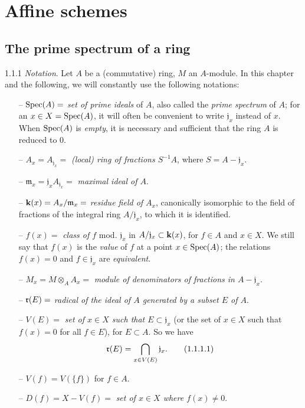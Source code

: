 \documentclass[10pt,oneside]{book}
\begin{document}
\setcounter{section}{0}
\section{Affine schemes}
\label{1-schemes-1}

\setcounter{subsection}{0}
\subsection{The prime spectrum of a ring}
\label{1-schemes-1.1}

\begin{env}{1.1.1}
\label{env-1.1.1.1}
\emph{Notation}. Let $A$ be a (commutative) ring, $M$ an $A$-module. In
this chapter and the following, we will constantly use the following notations:
\begin{itemize}
  \item[--] ${\mathop{\mathrm{Spec}}\nolimits}(A)=$ \emph{set of prime ideals} of $A$, also called the
          \emph{prime spectrum} of $A$; for an $x\in X={\mathop{\mathrm{Spec}}\nolimits}(A)$, it will often be
          convenient to write $\mathfrak{j}_x$ instead of $x$. When ${\mathop{\mathrm{Spec}}\nolimits}(A)$ is
          \emph{empty}, it is necessary and sufficient that the ring $A$ is
          reduced to $0$.
  \item[--] $A_x=A_{\mathfrak{j}_x}=$ \emph{(local) ring of fractions $S^{-1}A$},
          where $S=A-\mathfrak{j}_x$.
  \item[--] $\mathfrak{m}_x=\mathfrak{j}_x A_{\mathfrak{j}_x}=$ \emph{maximal ideal of $A$}.
  \item[--] $\mathbf{k}(x)=A_x/\mathfrak{m}_x=$ \emph{residue field of $A_x$},
          canonically isomorphic to the field of fractions
          of the integral ring $A/\mathfrak{j}_x$, to which it is identified.
  \item[--] $f(x)=$ \emph{class of $f$} mod. $\mathfrak{j}_x$ in $A/\mathfrak{j}_x\subset\mathbf{k}(x)$,
          for $f\in A$ and $x\in X$. We still say that $f(x)$ is the \emph{value}
          of $f$ at a point $x\in{\mathop{\mathrm{Spec}}\nolimits}(A)$; the relations $f(x)=0$ and $f\in\mathfrak{j}_x$
          are \emph{equivalent}.
  \item[--] $M_x=M\otimes_A A_x=$ \emph{module of denominators of fractions in
          $A-\mathfrak{j}_x$}.
  \item[--] $\mathfrak{r}(E)=$ \emph{radical of the ideal of $A$ generated by a subset $E$ of $A$}.
  \item[--] $V(E)=$ \emph{set of $x\in X$ such that $E\subset\mathfrak{j}_x$} (or the set of
          $x\in X$ such that $f(x)=0$ for all $f\in E$), for $E\subset A$. So we have
          \[
            \mathfrak{r}(E)=\bigcap_{x\in V(E)}\mathfrak{j}_x.\tag{1.1.1.1}
          \]
  \item[--] $V(f)=V(\{f\})$ for $f\in A$.
  \item[--] $D(f)=X-V(f)=$ \emph{set of $x\in X$ where $f(x)\neq 0$}.
\end{itemize}
\end{env}
\end{document}
